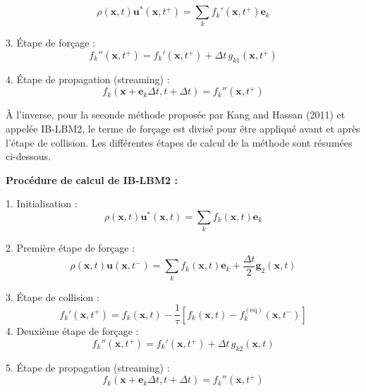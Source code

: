 \documentclass[12pt,a4paper]{report}
\begin{document}
\begin{equation}
\rho(\mathbf{x}, t)\mathbf{u}^*(\mathbf{x}, t^+) = \sum_k f_k'(\mathbf{x}, t^+)\mathbf{e}_k
\label{eq:ustar1}
\end{equation}

3. Étape de forçage :
\begin{equation}
f_k''(\mathbf{x}, t^+) = f_k'(\mathbf{x}, t^+) + \Delta t \, g_{k1}(\mathbf{x}, t^+)
\label{eq:forcing1}
\end{equation}

4. Étape de propagation (streaming) :
\begin{equation}
f_k(\mathbf{x} + \mathbf{e}_k \Delta t, t + \Delta t) = f_k''(\mathbf{x}, t^+)
\label{eq:streaming1}
\end{equation}

À l'inverse, pour la seconde méthode proposée par Kang and Hassan (2011) et appelée IB-LBM2, le terme de forçage est divisé pour être appliqué avant et après l'étape de collision. Les différentes étapes de calcul de la méthode sont résumées ci-dessous.

\textbf{Procédure de calcul de IB-LBM2 :}

1. Initialisation :
\begin{equation}
\rho(\mathbf{x}, t)\mathbf{u}^*(\mathbf{x}, t) = \sum_k f_k(\mathbf{x}, t)\mathbf{e}_k
\label{eq:init2}
\end{equation}

2. Première étape de forçage :
\begin{equation}
\rho(\mathbf{x}, t)\mathbf{u}(\mathbf{x}, t^-) = \sum_k f_k(\mathbf{x}, t)\mathbf{e}_k + \frac{\Delta t}{2} \mathbf{g}_2(\mathbf{x}, t)
\label{eq:forcing2}
\end{equation}

3. Étape de collision :
\begin{equation}
f_k'(\mathbf{x}, t^+) = f_k(\mathbf{x}, t) - \frac{1}{\tau} \left[ f_k(\mathbf{x}, t) - f_k^{(\text{eq})}(\mathbf{x}, t^-) \right]
\label{eq:collision2}
\end{equation}
4. Deuxième étape de forçage :
\begin{equation}
f_k''(\mathbf{x}, t^+) = f_k'(\mathbf{x}, t^+) + \Delta t \, g_{k2}(\mathbf{x}, t)
\label{eq:forcing2_2}
\end{equation}

5. Étape de propagation (streaming) :
\begin{equation}
f_k(\mathbf{x} + \mathbf{e}_k \Delta t, t + \Delta t) = f_k''(\mathbf{x}, t^+)
\label{eq:streaming2}
\end{equation}
\end{document}
